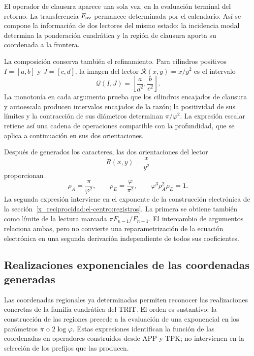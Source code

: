 El operador de clausura aparece una sola vez, en la evaluación terminal
del retorno. La transferencia \(F_{\rm av}\) permanece determinada
por el calendario. Así se compone la información de dos lectores del
mismo estado: la incidencia modal determina la ponderación cuadrática
y la región de clausura aporta su coordenada a la frontera.

La composición conserva también el refinamiento. Para cilindros positivos
\(I=[a,b]\) y \(J=[c,d]\), la imagen del lector
\(\mathcal R(x,y)=x/y^2\) es el intervalo
\[
 \mathcal Q(I,J)=\left[\frac{a}{d^2},\frac{b}{c^2}\right].
\]
La monotonía en cada argumento prueba que los cilindros encajados de
clausura y autoescala producen intervalos encajados de la razón; la
positividad de sus límites y la contracción de sus diámetros determinan
\(\pi/\varphi^2\). La expresión escalar retiene así una cadena
de operaciones compatible con la profundidad, que se aplica a
continuación en sus dos orientaciones.



Después de generados los caracteres, las dos orientaciones del lector
\[
 R(x,y)=\frac{x}{y^2}
\]
proporcionan
\begin{equation}
 \rho_A=\frac\pi{\varphi^2},\qquad
 \rho_E=\frac\varphi{\pi^2},\qquad
 \varphi^3\rho_A^2\rho_E=1.
 \label{x_reciprocidad:eq:areal-electron}
\end{equation}
La segunda expresión interviene en el exponente de la construcción electrónica de la sección~\ref{x_reciprocidad:el-centro:registros}. La primera se obtiene también como límite de la lectura marcada \(\pi F_{n-1}/F_{n+1}\). El intercambio de argumentos relaciona ambas, pero no convierte una reparametrización de la ecuación electrónica en una segunda derivación independiente de todos sus coeficientes.


\subsection{Realizaciones exponenciales de las coordenadas generadas}
\label{x_reciprocidad:euler-trit-articulacion}

Las coordenadas regionales ya determinadas permiten reconocer las
realizaciones concretas de la familia cuadrática del TRIT. El orden es
sustantivo: la construcción de las regiones precede a la evaluación de una
exponencial en los parámetros \(\pi\) o \(2\log\varphi\). Estas expresiones
identifican la función de las coordenadas en operadores construidos desde
APP y TPK; no intervienen en la selección de los prefijos que las producen.

